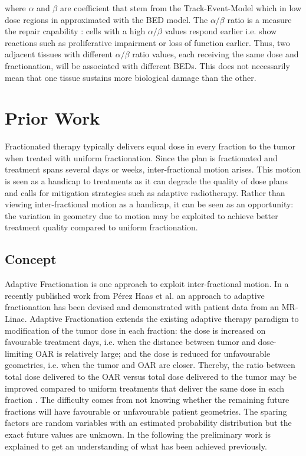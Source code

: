 \documentclass[\relativeRoot/ada.tex]{subfiles}
\begin{document}
where $\alpha$ and $\beta$ are coefficient that stem from the Track-Event-Model which in low dose regions in approximated with the BED model. The $\alpha / \beta$ ratio is a measure the repair capability : cells with a high $\alpha / \beta$ values respond earlier i.e. show reactions such as proliferative impairment or loss of function earlier. Thus, two adjacent tissues with different $\alpha / \beta$ ratio values, each receiving the same dose and fractionation, will be associated with different BEDs. This does not necessarily mean that one tissue sustains more biological damage than the other. \cite{jones_bedrole}

\section{Prior Work}

Fractionated therapy typically delivers equal dose in every fraction to the tumor when treated with uniform fractionation. Since the plan is fractionated and treatment spans several days or weeks, inter-fractional motion arises. This motion is seen as a handicap to treatments as it can degrade the quality of dose plans and calls for mitigation strategies such as adaptive radiotherapy. Rather than viewing inter-fractional motion as a handicap, it can be seen as an opportunity: the variation in geometry due to motion may be exploited to achieve better treatment quality compared to uniform fractionation.

\subsection{Concept}
Adaptive Fractionation \cite{lu_adaptI}\cite{chen_adaptII}\cite{ramakrishnan_adaptIII} is one approach to exploit inter-fractional motion. In a recently published work from Pérez Haas et al. \cite{perezhaas_adaptive} an approach to adaptive fractionation has been devised and demonstrated with patient data from an MR-Linac.
Adaptive Fractionation extends the existing adaptive therapy paradigm to modification of the tumor dose in each fraction: the dose is increased on favourable treatment days, i.e. when the distance between tumor and dose-limiting OAR is relatively large; and the dose is reduced for unfavourable geometries, i.e. when the tumor and OAR are closer. Thereby, the ratio between total dose delivered to the OAR versus total dose delivered to the tumor may be improved compared to uniform treatments that deliver the same dose in each fraction \cite{perezhaas_adaptive}. The difficulty comes from not knowing whether the remaining future fractions will have favourable  or unfavourable patient geometries. The sparing factors are random variables with an estimated probability distribution but the exact future values are unknown. In the following the preliminary work is explained to get an understanding of what has been achieved previously.
\end{document}
